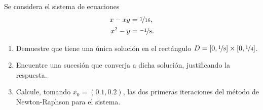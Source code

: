 \begin{ejercicio}\label{ej:1.1.18}
    Se considera el sistema de ecuaciones
    \begin{align*}
        x - xy &= \nicefrac{1}{16}, \\
        x^2 - y &= \nicefrac{-1}{8}.
    \end{align*}
    \begin{enumerate}
        \item Demuestre que tiene una única solución en el rectángulo $D = [0, \nicefrac{1}{8}] \times [0, \nicefrac{1}{4}]$.
        \item Encuentre una sucesión que converja a dicha solución, justificando la respuesta.
        \item Calcule, tomando $x_0 = (0.1, 0.2)$, las dos primeras iteraciones del método de Newton-Raphson para el sistema.
    \end{enumerate}
\end{ejercicio}